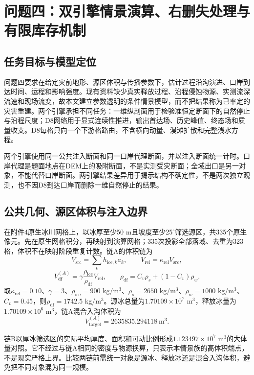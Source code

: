 \section{问题四：双引擎情景演算、右删失处理与有限库存机制}
\subsection{任务目标与模型定位}
问题四要求在给定灾前地形、源区体积与传播参数下，估计过程沿沟演进、口岸到达时间、运程和影响强度。现有资料缺少真实释放过程、沿程侵蚀物源、实测流深流速和现场流变，故本文建立参数透明的条件情景模型，而不把结果称为已率定的灾害重建。两个引擎承担不同任务：一维纵剖面用于检验准恒定断面下的自然停止与沿程尺度；D8网络用于显式连续性推进，输出首达场、历史峰值、终态场和质量收支。D8每格只向一个下游格路由，不含横向动量、漫滩扩散和完整浅水方程\cite{obrien1993}。

两个引擎使用同一公共注入断面和同一口岸代理断面，并以注入断面统一计时。口岸代理是题面地点在DEM上的吸附断面，不是实测受灾断面；全域出口是另一对象，不能代替口岸断面。两引擎结果差异用于揭示结构不确定性，不是两次独立观测，也不因D8到达口岸而删除一维自然停止的结果。

\subsection{公共几何、源区体积与注入边界}
在附件4原生冰川网格上，以冰厚至少50 m且坡度至少25$^\circ$筛选源区，共335个原生像元。先在原生网格积分，再映射到演算网格；335次投影全部落域、去重为323格，体积不在映射阶段重复计数。链A的体积链为
\begin{equation}
V_{\mathrm{src}}=\sum_{k}h_{\mathrm{ice},k}a_k,\qquad
V_{\mathrm{rel}}=\kappa_{\mathrm{rel}}V_{\mathrm{src}},
\end{equation}
\begin{equation}
V_{\mathrm{df}}^{(A)}
=\gamma\frac{\rho_{\mathrm{ice}}}{\rho_{\mathrm{df}}}V_{\mathrm{rel}},
\qquad
\rho_{\mathrm{df}}
=C_v\rho_s+(1-C_v)\rho_w.
\end{equation}
取$\kappa_{\mathrm{rel}}=0.10$、$\gamma=3$、$\rho_{\mathrm{ice}}=900$ kg/m$^3$、$\rho_s=2650$ kg/m$^3$、$\rho_w=1000$ kg/m$^3$、$C_v=0.45$，则$\rho_{\mathrm{df}}=1742.5$ kg/m$^3$。源冰总量为$1.70109\times10^7$ m$^3$，释放冰量为$1.70109\times10^6$ m$^3$，链A混合入沟体积为
\begin{equation}
V_{\mathrm{target}}^{(A)}
=2635835.294118\ \mathrm{m^3}.
\end{equation}

链B以厚冰筛选区的实际平均厚度、面积和可动比例形成$1.123497\times10^7$ m$^3$的大体量对照。它不经过与链A相同的密度与物源换算，只表示本情景族的高体积端点，不是现实严格上界。比较两链前需统一对象是源冰、释放冰还是混合入沟体积，避免把不同对象混为同一规模。

